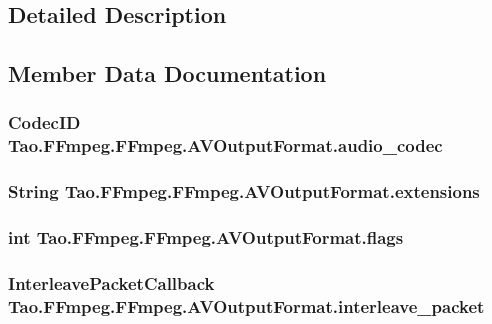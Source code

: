 \subsection{Detailed Description}


\subsection{Member Data Documentation}
\hypertarget{struct_tao_1_1_f_fmpeg_1_1_f_fmpeg_1_1_a_v_output_format_aa195bdc2726342bdf0a9c118b22309b0}{
\subsubsection[{audio\_\-codec}]{\setlength{\rightskip}{0pt plus 5cm}CodecID {\bf Tao.FFmpeg.FFmpeg.AVOutputFormat.audio\_\-codec}}}
\label{struct_tao_1_1_f_fmpeg_1_1_f_fmpeg_1_1_a_v_output_format_aa195bdc2726342bdf0a9c118b22309b0}
\hypertarget{struct_tao_1_1_f_fmpeg_1_1_f_fmpeg_1_1_a_v_output_format_a1f9cbd96358132f934470c4cffb5511e}{
\subsubsection[{extensions}]{\setlength{\rightskip}{0pt plus 5cm}String {\bf Tao.FFmpeg.FFmpeg.AVOutputFormat.extensions}}}
\label{struct_tao_1_1_f_fmpeg_1_1_f_fmpeg_1_1_a_v_output_format_a1f9cbd96358132f934470c4cffb5511e}
\hypertarget{struct_tao_1_1_f_fmpeg_1_1_f_fmpeg_1_1_a_v_output_format_a5bbbd7a33be7b4fb6e2ece064a9bad79}{
\subsubsection[{flags}]{\setlength{\rightskip}{0pt plus 5cm}int {\bf Tao.FFmpeg.FFmpeg.AVOutputFormat.flags}}}
\label{struct_tao_1_1_f_fmpeg_1_1_f_fmpeg_1_1_a_v_output_format_a5bbbd7a33be7b4fb6e2ece064a9bad79}
\hypertarget{struct_tao_1_1_f_fmpeg_1_1_f_fmpeg_1_1_a_v_output_format_afe452a8fea5802abb2725ba13af7b532}{
\subsubsection[{interleave\_\-packet}]{\setlength{\rightskip}{0pt plus 5cm}InterleavePacketCallback {\bf Tao.FFmpeg.FFmpeg.AVOutputFormat.interleave\_\-packet}}}
